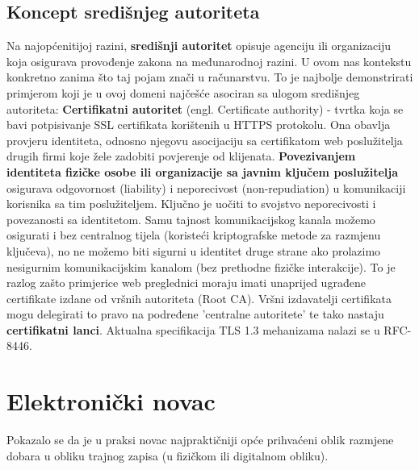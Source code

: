 \documentclass[utf8, zavrsni]{fer}
\begin{document}
\section{Koncept središnjeg autoriteta}
Na najopćenitijoj razini, \textbf{središnji autoritet} opisuje agenciju ili organizaciju koja osigurava provođenje zakona na međunarodnoj razini. U ovom nas kontekstu konkretno zanima što taj pojam znači u računarstvu. To je najbolje demonstrirati primjerom koji je u ovoj domeni najčešće asociran sa ulogom središnjeg autoriteta: \textbf{Certifikatni autoritet} (engl. Certificate authority) - tvrtka koja se bavi potpisivanje SSL certifikata korištenih u HTTPS protokolu. Ona obavlja provjeru identiteta, odnosno njegovu asocijaciju sa certifikatom web poslužitelja drugih firmi koje žele zadobiti povjerenje od klijenata. \textbf{Povezivanjem identiteta fizičke osobe ili organizacije sa javnim ključem poslužitelja} osigurava odgovornost (liability) i neporecivost (non-repudiation) u komunikaciji korisnika sa tim poslužiteljem. Ključno je uočiti to svojstvo neporecivosti i povezanosti sa identitetom. Samu tajnost komunikacijskog kanala možemo osigurati i bez centralnog tijela (koristeći kriptografske metode za razmjenu ključeva), no ne možemo biti sigurni u identitet druge strane ako prolazimo nesigurnim komunikacijskim kanalom (bez prethodne fizičke interakcije). To je razlog zašto primjerice web preglednici moraju imati unaprijed ugrađene certifikate izdane od vršnih autoriteta (Root CA). Vršni izdavatelji certifikata mogu delegirati to pravo na podređene 'centralne autoritete' te tako nastaju \textbf{certifikatni lanci}. Aktualna specifikacija TLS 1.3 mehanizama nalazi se u RFC-8446.


\chapter{Elektronički novac}

Pokazalo se da je u praksi novac najpraktičniji opće prihvaćeni oblik razmjene dobara u obliku trajnog zapisa (u fizičkom ili digitalnom obliku).
\end{document}
